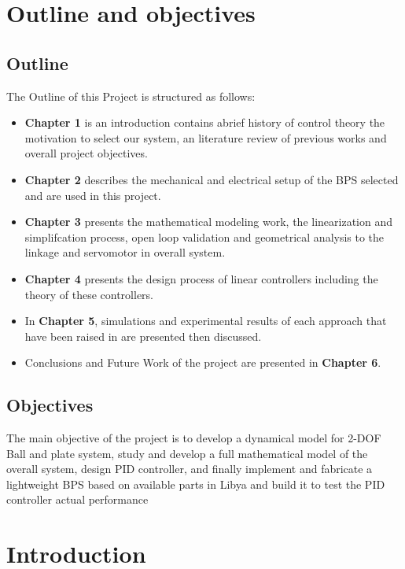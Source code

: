 \documentclass[12pt,oneside]{book}
\begin{document}
\chapter*{Outline and objectives}
{\large 
\begin{onehalfspacing}
    
\section*{Outline}
The Outline of this Project is structured as follows: 
\begin{itemize}
    \item \textbf{Chapter 1} is an introduction contains abrief history of control theory the motivation to select our system, an literature review of previous works and overall project objectives.  
    \item \textbf{Chapter 2} describes the mechanical and electrical setup of the BPS selected and are used in this project.
    \item \textbf{Chapter 3} presents the mathematical modeling work, the linearization and simplifcation process, open loop validation and geometrical analysis to the linkage and servomotor in overall system.
    \item \textbf{Chapter 4} presents the design process of linear controllers including the theory of these controllers. 
    \item In \textbf{Chapter 5}, simulations and experimental results of each approach that have been raised in are presented then discussed. 
    \item Conclusions and Future Work of the project are presented in \textbf{Chapter 6}.
    \end{itemize}
\end{onehalfspacing}
\vspace{2cm}
\section*{Objectives}
The main objective of the project is to develop a dynamical model for 2-DOF Ball and plate system, study and develop a full mathematical model of the overall system, design PID controller, and finally implement and fabricate a lightweight BPS based on available parts in Libya and build it to test the PID controller actual performance}


\tableofcontents
\listoftables
\listoffigures
\mainmatter
\chapter{Introduction}

\end{document}
